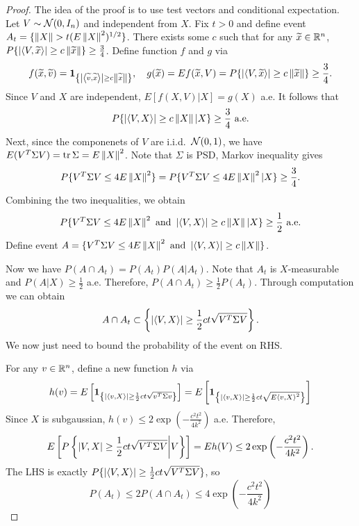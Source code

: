 \documentclass[a4paper]{article}
\begin{document}
\begin{proof}
  The idea of the proof is to use test vectors and conditional 
  expectation. Let $V \sim \mathcal{N} (0, I_n)$ and independent from $X$.
  Fix $t > 0$ and define event 
  $A_t = \{ \left\lVert X\right\rVert > t (E \left\lVert X\right\rVert^2)^{1/2} \}$.
  There exists some $c$ such that for any $\widetilde{x} \in \mathbb{R}^n$, 
  $P \{ \left\lvert \left\langle V, \widetilde{x} \right\rangle\right\rvert \geq c \left\lVert \widetilde{x}\right\rVert \} \geq 
  \frac{3}{4}$. Define function $f$ and $g$ via
  \[
  f(\widetilde{x}, \widetilde{v}) = \operatorname{\mathbf{1}}_{\left\{ \left\lvert \left\langle \widetilde{v}, 
  \widetilde{x} \right\rangle\right\rvert \geq c \left\lVert \widetilde{x}\right\rVert \right\}}, 
  \quad 
  g(\widetilde{x}) = E f(\widetilde{x}, V) 
  = P \{ \left\lvert \left\langle V, \widetilde{x} \right\rangle\right\rvert \geq c \left\lVert \widetilde{x}\right\rVert\} 
  \geq \frac{3}{4}.
  \]
  Since $V$ and $X$ are independent, $E [f(X, V) | X] = g(X)$ a.e. 
  It follows that 
  \[
  P \{ \left\lvert \left\langle V, X \right\rangle\right\rvert \geq c \left\lVert X\right\rVert | X \} \geq \frac{3}{4} \text{ a.e.}
  \]
  Next, since the componenets of $V$ are i.i.d.\ $\mathcal{N}(0, 1)$, 
  we have $E (V^T \Sigma V) = \operatorname{tr} \Sigma = E \left\lVert X\right\rVert^2$.
  Note that $\Sigma$ is PSD, Markov inequality gives 
  \[
  P \{ V^T \Sigma V \leq 4 E \left\lVert X\right\rVert^2 \} 
  = P \{ V^T \Sigma V \leq 4 E \left\lVert X\right\rVert^2 | X \} 
  \geq \frac{3}{4}.
  \]
  Combining the two inequalities, we obtain 
  \[
  P \{ V^T \Sigma V \leq 4 E \left\lVert X\right\rVert^2 \text{ and }
  \left\lvert \left\langle V, X \right\rangle\right\rvert \geq c \left\lVert X\right\rVert | X \} 
  \geq \frac{1}{2} \text{ a.e.}
  \]
  Define event $A = \{ V^T \Sigma V \leq 4 E \left\lVert X\right\rVert^2 \text{ and }
  \left\lvert \left\langle V, X \right\rangle\right\rvert \geq c \left\lVert X\right\rVert \}$.

  Now we have $P(A \cap A_t) = P(A_t) P(A | A_t)$. Note that 
  $A_t$ is $X$-measurable and $P( A | X ) \geq \frac{1}{2}$
  a.e. Therefore, $P(A \cap A_t) \geq \frac{1}{2} P(A_t)$. 
  Through computation we can obtain
  \[
  A \cap A_t \subset \left\{ \left\lvert  \left\langle V, X \right\rangle \right\rvert
  \geq \frac{1}{2} ct \sqrt{V^T \Sigma V} \right\}.
  \]
  We now just need to bound the probability of the event on RHS.

  For any $v \in \mathbb{R}^n$, define a new function $h$ via 
  \begin{align*}
    h (v) 
    = E \left[ \operatorname{\mathbf{1}}_{ \left\{ \left\lvert \left\langle v, X \right\rangle\right\rvert \geq \frac{1}{2} 
    c t \sqrt{ v^T \Sigma v} \right\} } \right]
    = E \left[ \operatorname{\mathbf{1}}_{ \left\{ \left\lvert \left\langle v, X \right\rangle\right\rvert \geq \frac{1}{2} c t 
    \sqrt{E \left\langle v, X \right\rangle^2} \right\} } \right]
  \end{align*}
  Since $X$ is subgaussian, $h(v) \leq 2 \exp \left( - \frac{c^2 t^2}{4 k^2} \right)$ a.e. 
  Therefore, 
  \[
  E \left[ P \left\{ \left\lvert V, X\right\rvert \geq \frac{1}{2} c t \sqrt{V^T \Sigma V} \middle| V \right\} \right]
  = E h (V) \leq 2 \exp \left( - \frac{c^2 t^2}{4 k^2} \right).
  \]
  The LHS is exactly $P \{ \left\lvert \left\langle V, X \right\rangle\right\rvert \geq \frac{1}{2} 
  c t \sqrt{ V^T \Sigma V } \} $, so 
  \[
  P(A_t) \leq 2 P(A \cap A_t) \leq 4 \exp \left( - \frac{c^2 t^2}{4 k^2} \right)
  \]

\end{proof}
\end{document}
